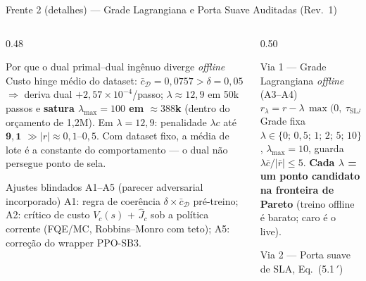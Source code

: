 \documentclass[aspectratio=169,10pt,xcolor={dvipsnames,table}]{beamer}
\begin{document}
\begin{frame}{Frente 2 (detalhes) --- Grade Lagrangiana e Porta Suave Auditadas (Rev.\ 1)}
  \begin{columns}[T]
    \begin{column}{0.48\textwidth}
      \begin{alertblock}{Por que o dual primal--dual ingênuo diverge \emph{offline}}
        \small Custo hinge médio do dataset: $\bar{c}_{\mathcal{D}} = 0{,}0757
        > \delta = 0{,}05$ $\Rightarrow$ deriva dual $+2{,}57\times10^{-4}$/passo;
        $\lambda \approx 12{,}9$ em 50k passos e \textbf{satura
        $\lambda_{\max}{=}100$ em ${\approx}388$k} (dentro do orçamento de
        1{,}2M). Em $\lambda{=}12{,}9$: penalidade $\lambda c$ até
        $\mathbf{9{,}1}$ $\gg |r| \approx 0{,}1$--$0{,}5$. Com dataset fixo, a
        média de lote é a constante do comportamento --- o dual não persegue
        ponto de sela.
      \end{alertblock}
      \begin{block}{Ajustes blindados A1--A5 (parecer adversarial incorporado)}
        \small A1: regra de coerência $\delta \times \bar{c}_{\mathcal{D}}$
        pré-treino; A2: crítico de custo $V_c(s)$ + $\hat{J}_c$ sob a política
        corrente (FQE/MC, Robbins--Monro com teto); A5: correção do wrapper
        PPO-SB3.
      \end{block}
    \end{column}
    \begin{column}{0.50\textwidth}
      \begin{exampleblock}{Via 1 --- Grade Lagrangiana \emph{offline} (A3--A4)}
        \small
        \begin{equation*}
          r_\lambda = r - \lambda\,\max\!\big(0,\ \tau_{\text{SLA}} -
          \bar{\rho}^{(W)}\big)
        \end{equation*}
        Grade fixa $\lambda \in \{0;\,0{,}5;\,1;\,2;\,5;\,10\}$,
        $\lambda_{\max} = 10$, guarda $\lambda\bar{c}/|\bar{r}| \le 5$.
        \textbf{Cada $\lambda$ = um ponto candidato na fronteira de Pareto}
        (treino offline é barato; caro é o live).
      \end{exampleblock}
      \begin{exampleblock}{Via 2 --- Porta suave de SLA, Eq.~(5.1\,$'$)}
        \small
        \begin{equation*}

\end{equation*}
\end{exampleblock}
\end{column}
\end{columns}
\end{frame}
\end{document}
